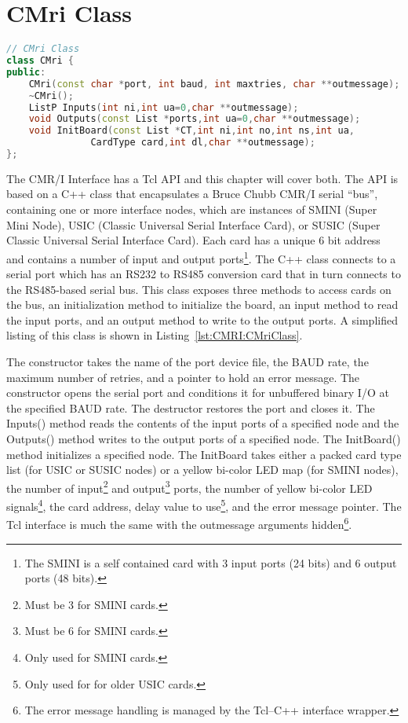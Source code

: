\section{CMri Class}
\begin{lstlisting}[caption={CMri Class},
		   language=C++,label=lst:CMRI:CMriClass]
// CMri Class
class CMri {
public:
	CMri(const char *port, int baud, int maxtries, char **outmessage);
	~CMri();
	ListP Inputs(int ni,int ua=0,char **outmessage);
	void Outputs(const List *ports,int ua=0,char **outmessage);
	void InitBoard(const List *CT,int ni,int no,int ns,int ua,
		       CardType card,int dl,char **outmessage);
};
\end{lstlisting}
The CMR/I Interface\cite{internals} has a Tcl API and
this chapter will cover both. The API is based on a
C++ class that encapsulates a Bruce Chubb
CMR/I\cite{Chubb89,ChubbBAS04} serial ``bus'', containing one or more
interface nodes, which are instances of SMINI (Super Mini
Node), USIC (Classic Universal Serial Interface
Card), or SUSIC (Super Classic Universal
Serial Interface Card). Each card has a unique 6 bit address and
contains a number of input and output ports\footnote{The SMINI is a
self contained card with 3 input ports (24 bits) and 6 output ports (48
bits).}. The C++ class connects to a serial port which has an RS232 to
RS485 conversion card that in turn connects to the RS485-based serial
bus. This class exposes three methods to access cards on the bus, an
initialization method to initialize the board, an input method to read
the input ports, and an output method to write to the output ports. A
simplified listing of this class is shown in
Listing~\ref{lst:CMRI:CMriClass}. 

The constructor takes the name of the port device file, the BAUD rate,
the maximum number of retries, and a pointer to hold an error message.
The constructor opens the serial port and conditions it for unbuffered
binary I/O at the specified BAUD rate. The destructor restores the port
and closes it. The Inputs() method reads the contents of the input
ports of a specified node and the Outputs() method writes to the output
ports of a specified node. The InitBoard() method initializes a
specified node. The InitBoard takes either a packed card type list (for
USIC or SUSIC nodes) or a yellow bi-color LED map (for SMINI nodes),
the number of input\footnote{Must be 3 for SMINI cards.} and
output\footnote{Must be 6 for SMINI cards.} ports, the number of yellow
bi-color LED signals\footnote{Only used for SMINI cards.}, the card
address, delay value to use\footnote{Only used for for older USIC
cards.}, and the error message pointer.  The Tcl interface is much the
same with the outmessage arguments hidden\footnote{The error message
handling is managed by the Tcl--C++ interface wrapper.}.


